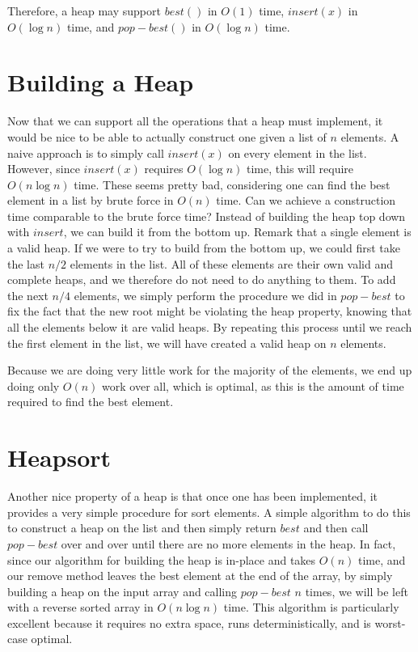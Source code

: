 Therefore, a heap may support $best()$ in $O(1)$ time, $insert(x)$ 
in $O(\log n)$ time, and $pop-best()$ in $O(\log n)$ time.

\section{Building a Heap}

Now that we can support all the operations that a heap must implement,
it would be nice to be able to actually construct one given a list of $n$
elements. A naive approach is to simply call $insert(x)$ on every element
in the list. However, since $insert(x)$ requires $O(\log n)$ time, this will
require $O(n \log n)$ time. These seems pretty bad, considering one can find
the best element in a list by brute force in $O(n)$ time. Can we achieve a
construction time comparable to the brute force time?
Instead of building the heap top down with $insert$, we can build it from the
bottom up. Remark that a single element is a valid heap. If we were to try to
build from the bottom up, we could first take the last $n/2$ elements in the
list. All of these elements are their own valid and complete heaps,
and we therefore do not need to do anything to them.
To add the next $n/4$ elements, we simply perform
the procedure we did in $pop-best$ to fix the fact that the new root might
be violating the heap property, knowing that all the elements below it are
valid heaps. By repeating this process until we reach the first element in
the list, we will have created a valid heap on $n$ elements.

Because we are doing very little work for the majority of the elements, we end
up doing only $O(n)$ work over all, which is optimal, as this is the amount of
time required to find the best element.

\section{Heapsort}

Another nice property of a heap is that once one has been implemented,
it provides a very simple procedure for sort elements.
A simple algorithm to do this to construct a heap on the list and then simply
return $best$ and then call $pop-best$ over and over until there are no more
elements in the heap.
In fact, since our algorithm for building the heap is in-place and takes $O(n)$
time, and our remove method leaves the best element at the end of the array,
by simply building a heap on the input array and calling $pop-best$ $n$ times,
we will be left with a reverse sorted array in $O(n \log n)$ time. 
This algorithm is particularly excellent because it requires no extra space,
runs deterministically, and is worst-case optimal.

